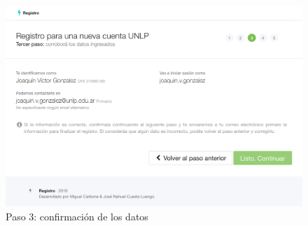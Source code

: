 \begin{figure}[H]
  \centering
  \includegraphics[width=\textwidth,keepaspectratio]{src/images/05-capitulo-5/capturas/page_003.png}
  \caption{Paso 3: confirmación de los datos}
  \label{fig:caso-testigo:captura-003}
\end{figure}